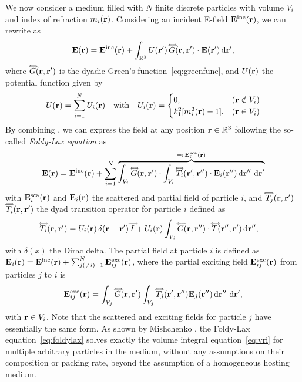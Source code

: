 We now consider a medium filled with $N$ finite discrete particles with volume $V_i$ and index of refraction $m_i(\mathbf{r})$. Considering an incident E-field $\mathbf{E}^\text{inc}(\mathbf{r})$, we can rewrite  as
\begin{equation}
    \mathbf{E}(\mathbf{r}) = \mathbf{E}^\text{inc}(\mathbf{r}) + \int_{\mathbb{R}^3} U(\mathbf{r}')\,\accentset{\Longleftrightarrow}{G}(\mathbf{r},\mathbf{r}') \cdot \mathbf{E}(\mathbf{r}') \,\text{d}\mathbf{r}',
    \label{eq:EfieldParticles}
\end{equation}
where $\accentset{\Longleftrightarrow}{G}(\mathbf{r},\mathbf{r}')$ is the dyadic Green's function~\eqref{eq:greenfunc}, and $U(\mathbf{r})$ the potential function given by
\begin{equation}
    U(\mathbf{r}) = \sum_{i=1}^{N} U_i(\mathbf{r}) \quad \text{with} \quad U_i(\mathbf{r}) = \begin{cases} 
    0, & (\mathbf{r} \notin V_i)\\ 
    k_1^2[m_i^2(\mathbf{r})-1]. & (\mathbf{r} \in V_i)
    \end{cases}
    \label{eq:potential}
\end{equation}
By combining , we can express the field at any position $\mathbf{r}\in\mathbb{R}^3$ following the so-called \emph{Foldy-Lax equation} \cite{foldy1945multiple,lax1951multiple} as
\begin{equation}
\mathbf{E}(\mathbf{r}) = \mathbf{E}^\text{inc}(\mathbf{r}) + \sum_{i=1}^N \overbrace{\int_{V_i} \accentset{\Longleftrightarrow}{G}(\mathbf{r},\mathbf{r}')\cdot \int_{V_i} \accentset{\Longleftrightarrow}{T}_i(\mathbf{r}',\mathbf{r}'') \cdot  \mathbf{E}_i(\mathbf{r}'') \,\text{d}\mathbf{r}''\,\,\text{d}\mathbf{r}'}^{=\vcentcolon \,\mathbf{E}^\text{sca}_i(\mathbf{r})}    \label{eq:foldylax}
\end{equation}
with $\mathbf{E}^\text{sca}_i(\mathbf{r})$ and $\mathbf{E}_i(\mathbf{r})$ the scattered and partial field of particle $i$, and $\accentset{\Longleftrightarrow}{T}_j(\mathbf{r},\mathbf{r}')$ $\accentset{\Longleftrightarrow}{T}_i(\mathbf{r},\mathbf{r}')$ the dyad transition operator for particle $i$ defined as \cite{tsang1985theory} 
\begin{equation}
\label{eq:dyadtransition}
    \begin{split}
        \accentset{\Longleftrightarrow}{T}_i(\mathbf{r},\mathbf{r}') =\;& U_i(\mathbf{r}) \,\delta(\mathbf{r}-\mathbf{r}')\,\accentset{\Longleftrightarrow}{I} + U_i(\mathbf{r}) \int_{V_i} \accentset{\Longleftrightarrow}{G}(\mathbf{r},\mathbf{r}'') \cdot \accentset{\Longleftrightarrow}{T}(\mathbf{r}'',\mathbf{r}') \,\text{d}\mathbf{r}'',
    \end{split}
\end{equation}
with $\delta(x)$ the Dirac delta. 
The partial field at particle $i$ is defined as $\mathbf{E}_i(\mathbf{r})=\mathbf{E}^\text{inc}(\mathbf{r}) + \sum_{j(\neq i)=1}^N \mathbf{E}^\text{exc}_{ij}(\mathbf{r})$, where the partial exciting field $\mathbf{E}^\text{exc}_{ij}(\mathbf{r})$ from particles $j$ to $i$ is 
\begin{equation}
\mathbf{E}^\text{exc}_{ij}(\mathbf{r}) = \int_{V_j} \accentset{\Longleftrightarrow}{G}(\mathbf{r},\mathbf{r}')\int_{V_j} \accentset{\Longleftrightarrow}{T}_j(\mathbf{r}',\mathbf{r}'') \mathbf{E}_j(\mathbf{r}'') \,\text{d}\mathbf{r}''\,\,\text{d}\mathbf{r}',
\label{eq:excfield}
\end{equation}
with $\mathbf{r}\in V_i$. Note that the scattered and exciting fields for particle $j$ have essentially the same form. 
As shown by Mishchenko \cite{mishchenko2002vector}, the Foldy-Lax equation~\eqref{eq:foldylax} solves exactly the volume integral equation~\eqref{eq:vri} for multiple arbitrary particles in the medium, without any assumptions on their composition or packing rate, beyond the assumption of a homogeneous hosting medium.

